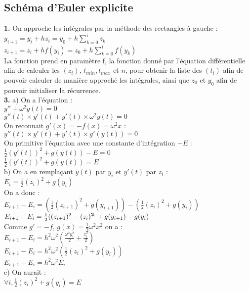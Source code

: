 \documentclass{article}
\begin{document}
\subsection{Schéma d'Euler explicite}
{\bf 1.} On approche les intégrales par la méthode des rectangles à gauche : \\
$y_{ i+1}=y_i + h z_i = y_0 + h\sum_{k=0}^{i}z_k $ \\
$z_{i+1}=z_i + h f(y_i)= z_0 + h\sum_{k=0}^{i} f(y_k) $ \\

La fonction prend en paramètre f, la fonction donné par l'équation différentielle afin de calculer les $(z_i)$, $t_{min}, t_{max}$ et $n$, pour obtenir la liste des $(t_i)$ afin de pouvoir calculer de manière approché les intégrales, ainsi que $z_0$ et $y_0$ afin de pouvoir initialiser la récurrence. \\
{\bf 3.} a) On a l'équation : \\
$y''+ \omega^2y(t)=0$ \\
$y''(t) \times y'(t) + y'(t) \times \omega^2 y(t)=0$ \\
On reconnait $g'(x)=-f(x)=\omega^2x $ : \\
$y''(t) \times y'(t) + y'(t) \times g'(y(t))=0$ \\
On primitive l'équation avec une constante d'intégration $-E$ : \\
$\frac{1}{2} (y'(t))^2 + g(y(t))-E=0$ \\
$\frac{1}{2} (y'(t))^2 + g(y(t))=E$ \\
b) On a en remplaçant $y(t)$ par $y_i$ et $y'(t)$ par $z_i$ : \\
$E_i=\frac{1}{2} (z_i)^2 + g(y_i)$ \\
On a donc : \\
$E_{i+1}-E_i =(\frac{1}{2} (z_{i+1})^2 + g(y_{i+1}))-(\frac{1}{2} (z_i)^2 + g(y_i))$ \\
$E_{i+1}-E_i =\frac{1}{2} ((z_{i+1})^2-(z_i)^{\bf 2.} + g(y_{i+1})-g(y_i)$ \\
Comme $g'=-f$, $g(x)=\frac{1}{2} \omega^2 x^2$  on a : \\
$E_{i+1}-E_i = h^2  \omega^2 (\frac{\omega^2 y_i^2}{2}+\frac{z_i^2}{2})$ \\
$E_{i+1}-E_i =h^2  \omega^2 (\frac{1}{2} (z_i)^2 + g(y_i))$ \\
$E_{i+1}-E_i =h^2  \omega^2 E_i$ \\
c) On aurait : \\
$\forall i, \frac{1}{2} (z_i)^2 + g(y_i)=E$ \\
\end{document}
